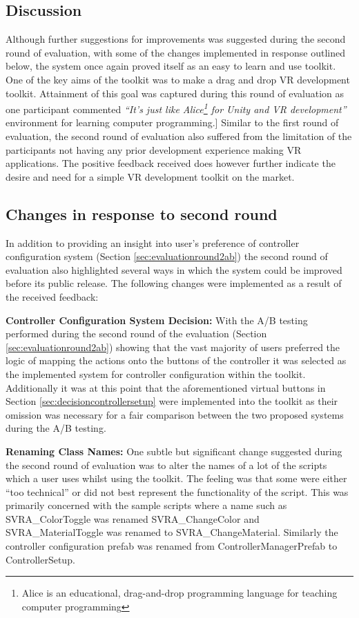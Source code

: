 \documentclass{l4proj}
\begin{document}
\subsection{Discussion}
\label{sec:evlauationdiscuss2}
Although further suggestions for improvements was suggested during the second round of evaluation, with some of the changes implemented in response outlined below, the system once again proved itself as an easy to learn and use toolkit. One of the key aims of the toolkit was to make a drag and drop VR development toolkit. Attainment of this goal was captured during this round of evaluation as one participant commented \textit{``It's just like Alice\footnote{Alice is an educational, drag-and-drop programming language for teaching computer programming} for Unity and VR development''} environment for learning computer programming.] Similar to the first round of evaluation, the second round of evaluation also suffered from the limitation of the participants not having any prior development experience making VR applications. The positive feedback received does however further indicate the desire and need for a simple VR development toolkit on the market.

\subsection{Changes in response to second round}
\label{sec:implementationchangesduetoeval2}
In addition to providing an insight into user's preference of controller configuration system (Section \ref{sec:evaluationround2ab}) the second round of evaluation also highlighted several ways in which the system could be improved before its public release. The following changes were implemented as a result of the received feedback:

\textbf{Controller Configuration System Decision:} With the A/B testing performed during the second round of the evaluation (Section \ref{sec:evaluationround2ab}) showing that the vast majority of users preferred the logic of mapping the actions onto the buttons of the controller it was selected as the implemented system for controller configuration within the toolkit. Additionally it was at this point that the aforementioned virtual buttons in Section \ref{sec:decisioncontrollersetup} were implemented into the toolkit as their omission was necessary for a fair comparison between the two proposed systems during the A/B testing. 

\textbf{Renaming Class Names:} One subtle but significant change suggested during the second round of evaluation was to alter the names of a lot of the scripts which a user uses whilst using the toolkit. The feeling was that some were either ``too technical'' or did not best represent the functionality of the script. This was primarily concerned with the sample scripts where a name such as SVRA\_ColorToggle was renamed SVRA\_ChangeColor and SVRA\_MaterialToggle was renamed to SVRA\_ChangeMaterial. Similarly the controller configuration prefab was renamed from ControllerManagerPrefab to ControllerSetup.
\end{document}
